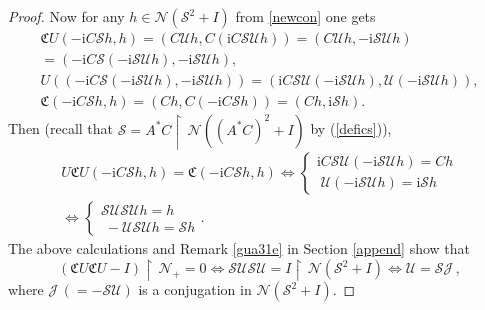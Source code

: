 \documentclass[12pt]{amsart}
\newcommand{\ii}{\mathrm{i}}
\def\sC{{\mathfrak C}}
\theoremstyle{definition}
\newcommand{\cJ}{\mathcal{J}\,}
\newcommand{\cN}{\mathcal{N}}
\newcommand{\cS}{\mathcal{S}}
\newcommand{\cU}{\mathcal{U}}
\def\uphar{{\upharpoonright\,}}
\begin{document}
\begin{proof}
 Now for any $h\in\cN(\cS^2+I)$ from \eqref{newcon} one gets
\[
\begin{array}{l}
\sC U(-\ii C\cS h, h)=(C\cU h,C(\ii C\cS\cU h))=(C\cU h,-\ii\cS\cU h)\\[2mm]
=(-\ii C\cS(-\ii\cS\cU h),-\ii\cS\cU h),\\[2mm]
U((-\ii C\cS(-\ii \cS\cU h),-\ii \cS\cU h)) %
=(\ii C\cS\cU(-\ii \cS\cU h),\cU(-\ii \cS\cU h)),\\[2mm]
\sC(-\ii C\cS h, h)=(Ch,C(-\ii C\cS h))=(Ch,\ii\cS h).
\end{array}
\]
Then (recall that  $\cS=A^*C\uphar\cN((A^*C)^2+I)$ by (\ref{defics})),
\[
\begin{array}{l}
U\sC U(-\ii C\cS h, h)=\sC(-\ii C\cS h, h)\Longleftrightarrow \left\{\begin{array}{l}\ii C\cS\cU(-\ii\cS\cU h)=Ch\\
\; \cU(-\ii\cS\cU h)=\ii\cS h\end{array}\right.\\
\Longleftrightarrow \left\{\begin{array}{l}\cS\cU \cS\cU h=h\\
\;- \cU \cS\cU h=\cS h\end{array}\right..
\end{array}
\]
The above calculations  and Remark \ref{gua31e} in Section \ref{append} show that
 \[
 (\sC U\sC U-I)\uphar\cN_+=0\Longleftrightarrow \cS\cU\cS\cU=I\uphar\cN(\cS^2+I)\Longleftrightarrow \cU=\cS\cJ,
 \]
 where $\cJ(=-\cS\cU)$ is a conjugation in $\cN(\cS^2+I)$.


\end{proof}
\end{document}
